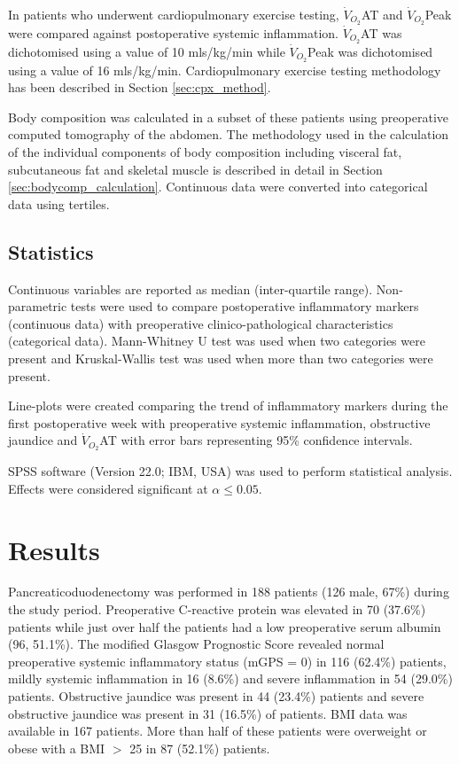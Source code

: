 In patients who underwent cardiopulmonary exercise testing, $\dot{V}_{O_2}$AT and $\dot{V}_{O_2}$Peak were compared against postoperative systemic inflammation. 
$\dot{V}_{O_2}$AT was dichotomised using a value of 10 mls/kg/min while $\dot{V}_{O_2}$Peak was dichotomised using a value of 16 mls/kg/min. 
Cardiopulmonary exercise testing methodology has been described in Section \ref{sec:cpx_method}.

Body composition was calculated in a subset of these patients using preoperative computed tomography of the abdomen. 
The methodology used in the calculation of the individual components of body composition including visceral fat, subcutaneous fat and skeletal muscle is described in detail in Section \ref{sec:bodycomp_calculation}. 
Continuous data were converted into categorical data using tertiles.

\subsection{Statistics}

Continuous variables are reported as median (inter-quartile range).
Non-parametric tests were used to compare postoperative inflammatory markers (continuous data) with preoperative clinico-pathological characteristics (categorical data). 
Mann-Whitney U test was used when two categories were present and Kruskal-Wallis test was used when more than two categories were present.

Line-plots were created comparing the trend of inflammatory markers during the first postoperative week with preoperative systemic inflammation, obstructive jaundice and $\dot{V}_{O_2}$AT with error bars representing 95\% confidence intervals. 

SPSS software (Version 22.0; IBM, USA) was used to perform statistical analysis. Effects were considered significant at $\alpha \leq0.05$. 

\section{Results}

Pancreaticoduodenectomy was performed in 188 patients (126 male, 67\%) during the study period.
Preoperative C-reactive protein was elevated in 70 (37.6\%) patients while just over half the patients had a low preoperative serum albumin (96, 51.1\%). 
The modified Glasgow Prognostic Score revealed normal preoperative systemic inflammatory status (mGPS = 0) in 116 (62.4\%) patients, mildly systemic inflammation in 16 (8.6\%) and severe inflammation in 54 (29.0\%) patients. 
Obstructive jaundice was present in 44 (23.4\%) patients and severe obstructive jaundice was present in 31 (16.5\%) of patients. 
BMI data was available in 167 patients. More than half of these patients were overweight or obese with a BMI $>$ 25 in 87 (52.1\%) patients.

